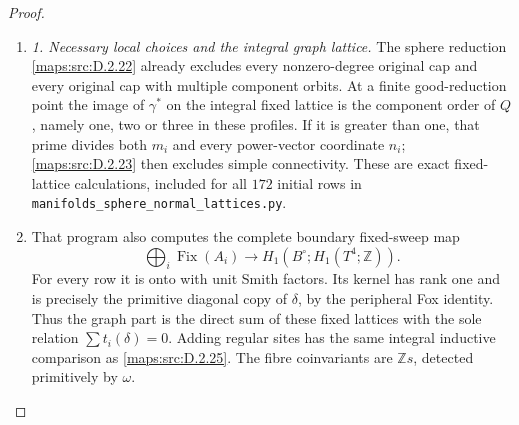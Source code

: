 \begin{proof}
\begin{enumerate}[label=\arabic*.,leftmargin=*]
\item \emph{1. Necessary local choices and the integral graph lattice.}
The sphere reduction \ref{maps:src:D.2.22} already excludes every nonzero-degree
original cap and every original cap with multiple component orbits.
At a finite good-reduction point the image of $\gamma^*$ on the
integral fixed lattice is the component order of $Q$, namely one,
two or three in these profiles. If it is greater than one, that
prime divides both $m_i$ and every power-vector coordinate $n_i$;
\ref{maps:src:D.2.23} then excludes simple connectivity. These are exact fixed-lattice
calculations, included for all $172$ initial rows in
\texttt{manifolds\_sphere\_normal\_lattices.py}.

\item That program also computes the complete boundary fixed-sweep map
\[
 \bigoplus_i\operatorname{Fix}(A_i)
       \longrightarrow H_1(B^\circ;H_1(T^4;\mathbb Z)).
\]
For every row it is onto with unit Smith factors. Its kernel has
rank one and is precisely the primitive diagonal copy of $\delta$,
by the peripheral Fox identity. Thus the graph part is the direct
sum of these fixed lattices with the sole relation
$\sum t_i(\delta)=0$. Adding regular sites has the same integral
inductive comparison as \ref{maps:src:D.2.25}. The fibre coinvariants are
$\mathbb Zs$, detected primitively by $\omega$.


\end{enumerate}
\end{proof}
